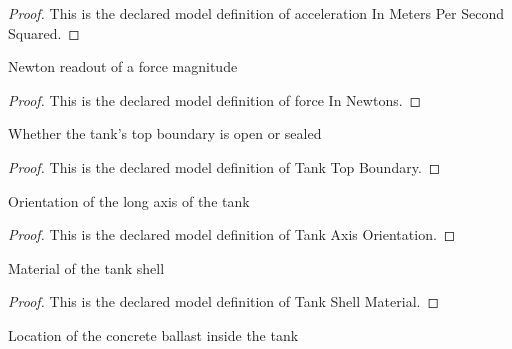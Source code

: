 \begin{proof}
  This is the declared model definition of acceleration In Meters Per Second Squared.
\end{proof}
\begin{definition}
  \label{def:physics:phyx-mini-0664:phyxminiproblems-problemphyxmini0664-forceinnewtons}
  Newton readout of a force magnitude
\end{definition}
\begin{proof}
  This is the declared model definition of force In Newtons.
\end{proof}
\begin{definition}
  \label{def:physics:phyx-mini-0664:phyxminiproblems-problemphyxmini0664-tanktopboundary}
  Whether the tank's top boundary is open or sealed
\end{definition}
\begin{proof}
  This is the declared model definition of Tank Top Boundary.
\end{proof}
\begin{definition}
  \label{def:physics:phyx-mini-0664:phyxminiproblems-problemphyxmini0664-tankaxisorientation}
  Orientation of the long axis of the tank
\end{definition}
\begin{proof}
  This is the declared model definition of Tank Axis Orientation.
\end{proof}
\begin{definition}
  \label{def:physics:phyx-mini-0664:phyxminiproblems-problemphyxmini0664-tankshellmaterial}
  Material of the tank shell
\end{definition}
\begin{proof}
  This is the declared model definition of Tank Shell Material.
\end{proof}
\begin{definition}
  \label{def:physics:phyx-mini-0664:phyxminiproblems-problemphyxmini0664-ballastlocation}
  Location of the concrete ballast inside the tank
\end{definition}
